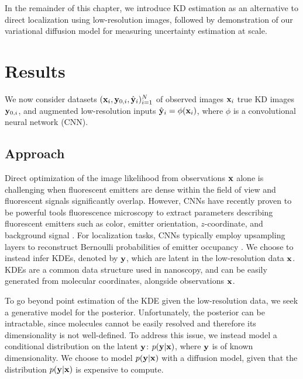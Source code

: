 In the remainder of this chapter, we introduce KD estimation as an alternative to direct localization using low-resolution images, followed by demonstration of our variational diffusion model for measuring uncertainty estimation at scale. 

\section{Results}

We now consider datasets $(\bold{x}_i,\bold{y}_{0,i},\hat{\bold{y}}_{i})_{i=1}^{N}$ of observed images $\bold{x}_i$ true KD images $\bold{y}_{0,i}$, and augmented low-resolution inputs $\hat{\bold{y}}_{i}=\phi(\bold{x}_{i})$, where $\phi$ is a convolutional neural network (CNN).

\subsection{Approach}

Direct optimization of the image likelihood from observations $\bold{x}$ alone is challenging when fluorescent emitters are dense within the field of view and fluorescent signals significantly overlap. However, CNNs have recently proven to be powerful tools fluorescence microscopy to extract parameters describing fluorescent emitters such as color, emitter orientation, $z$-coordinate, and background signal \cite{Zhang2018,Kim2019,Zelger2018}. For localization tasks, CNNs typically employ upsampling layers to reconstruct Bernoulli probabilities of emitter occupancy \parencite{Speiser2021,Nehme2020}. We choose to instead infer KDEs, denoted by $\bold{y}$, which are latent in the low-resolution data $\bold{x}$. KDEs are a common data structure used in nanoscopy, and can be easily generated from molecular coordinates, alongside observations $\bold{x}$.

To go beyond point estimation of the KDE given the low-resolution data, we seek a generative model for the posterior. Unfortunately, the posterior can be intractable, since molecules cannot be easily resolved and therefore its dimensionality is not well-defined. To address this issue, we instead model a conditional distribution on the latent $\bold{y}$: $p(\bold{y}\lvert\bold{x})$, where $\bold{y}$ is of known dimensionality. We choose to model $p(\bold{y}\lvert\bold{x})$ with a diffusion model, given that the distribution $p(\bold{y}\lvert\bold{x})$ is expensive to compute.

